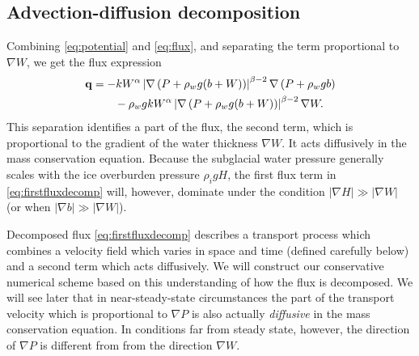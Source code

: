 \documentclass[11pt,final]{amsart}
\newcommand\bq{\mathbf{q}}
\newcommand{\grad}{\nabla}
\begin{document}
\subsection*{Advection-diffusion decomposition}  Combining \eqref{eq:potential} and \eqref{eq:flux}, and separating the term proportional to $\grad W$, we get the flux expression
\begin{align}
  \bq &= - k  W^\alpha \left|\grad \left(P + \rho_w g (b+W) \right)\right|^{\beta-2} \grad \left(P + \rho_w g b\right)  \label{eq:firstfluxdecomp} \\
      &\qquad - \rho_w g k W^\alpha \left|\grad \left(P + \rho_w g (b+W) \right)\right|^{\beta-2} \grad W. \notag
\end{align}
This separation identifies a part of the flux, the second term, which is proportional to the gradient of the water thickness $\grad W$.  It acts diffusively in the mass conservation equation.  Because the subglacial water pressure generally scales with the ice overburden pressure $\rho_i g H$, the first flux term in \eqref{eq:firstfluxdecomp} will, however, dominate under the condition $|\grad H| \gg |\grad W|$ (or when $|\grad b| \gg |\grad W|$).

Decomposed flux \eqref{eq:firstfluxdecomp} describes a transport process which combines a velocity field which varies in space and time (defined carefully below) and a second term which acts diffusively.  We will construct our conservative numerical scheme based on this understanding of how the flux is decomposed.  We will see later that in near-steady-state circumstances the part of the transport velocity which is proportional to $\grad P$ is also actually \emph{diffusive} in the mass conservation equation.  In conditions far from steady state, however, the direction of $\grad P$ is different from from the direction $\grad W$.
\end{document}
